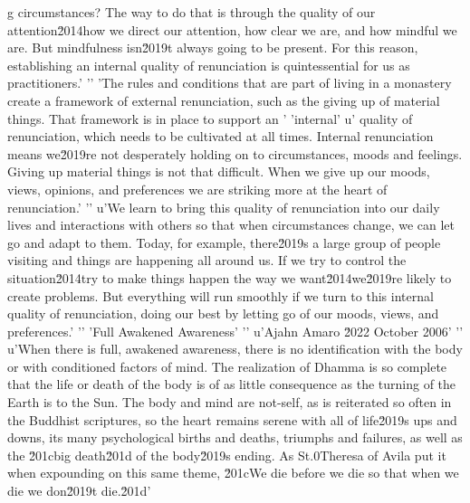g circumstances? The way to do that is through the quality of our attention\u2014how we direct our attention, how clear we are, and how mindful we are. But mindfulness isn\u2019t always going to be present. For this reason, establishing an internal quality of renunciation is quintessential for us as practitioners.'
'\n'
'The rules and conditions that are part of living in a monastery create a framework of external renunciation, such as the giving up of material things. That framework is in place to support an '
'internal'
u' quality of renunciation, which needs to be cultivated at all times. Internal renunciation means we\u2019re not desperately holding on to circumstances, moods and feelings. Giving up material things is not that difficult. When we give up our moods, views, opinions, and preferences we are striking more at the heart of renunciation.'
'\n'
u'We learn to bring this quality of renunciation into our daily lives and interactions with others so that when circumstances change, we can let go and adapt to them. Today, for example, there\u2019s a large group of people visiting and things are happening all around us. If we try to control the situation\u2014try to make things happen the way we want\u2014we\u2019re likely to create problems. But everything will run smoothly if we turn to this internal quality of renunciation, doing our best by letting go of our moods, views, and preferences.'
'\n'
'Full Awakened Awareness'
'\n'
u'Ajahn Amaro \u2022 October 2006'
'\n'
u'When there is full, awakened awareness, there is no identification with the body or with conditioned factors of mind. The realization of Dhamma is so complete that the life or death of the body is of as little consequence as the turning of the Earth is to the Sun. The body and mind are not-self, as is reiterated so often in the Buddhist scriptures, so the heart remains serene with all of life\u2019s ups and downs, its many psychological births and deaths, triumphs and failures, as well as the \u201cbig death\u201d of the body\u2019s ending. As St.\xa0Theresa of Avila put it when expounding on this same theme, \u201cWe die before we die so that when we die we don\u2019t die.\u201d'
